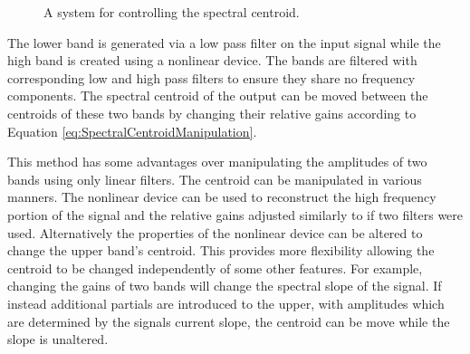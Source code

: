 			\begin{figure}[h!]
				\centering
				\caption{A system for controlling the spectral centroid.}
				\label{fig:TwoBandSpectralCentroidSystem}
			\end{figure}

			The lower band is generated via a low pass filter on the input signal while the high band is
			created using a nonlinear device. The bands are filtered with corresponding low and high pass
			filters to ensure they share no frequency components. The spectral centroid of the output can be
			moved between the centroids of these two bands by changing their relative gains according to
			Equation \ref{eq:SpectralCentroidManipulation}.

			This method has some advantages over manipulating the amplitudes of two bands using only linear
			filters. The centroid can be manipulated in various manners. The nonlinear device can be used to
			reconstruct the high frequency portion of the signal and the relative gains adjusted similarly to
			if two filters were used.  Alternatively the properties of the nonlinear device can be altered to
			change the upper band's centroid. This provides more flexibility allowing the centroid to be
			changed independently of some other features. For example, changing the gains of two bands will
			change the spectral slope of the signal. If instead additional partials are introduced to the
			upper, with amplitudes which are determined by the signals current slope, the centroid can be move
			while the slope is unaltered.

